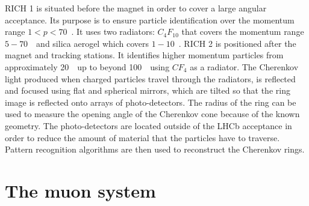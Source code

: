 RICH 1 is situated before the magnet in order to cover a large angular acceptance. Its purpose is to ensure
particle identification over the momentum range \mbox{$1 < p < 70$~\gevc}. It uses two radiators: $C_4F_{10}$ that covers
the momentum range $5-70$~\gevc~and silica aerogel which covers $1-10$~\gevc. RICH 2 is positioned after
the magnet and tracking stations. It identifies higher momentum particles from approximately 20~\gevc~up to beyond
100~\gevc~using $CF_4$ as a radiator.
The Cherenkov light produced when charged particles travel through the radiators, is reflected and focused using
flat and spherical mirrors, which are tilted so that the ring image is reflected onto arrays of photo-detectors.
The radius of the ring can be used to measure the opening angle of the Cherenkov cone because of the known geometry.
The photo-detectors are located outside of the LHCb acceptance in order to reduce the amount of material that
the particles have to traverse. Pattern recognition algorithms are then used to reconstruct the Cherenkov rings.



\section{The muon system}

